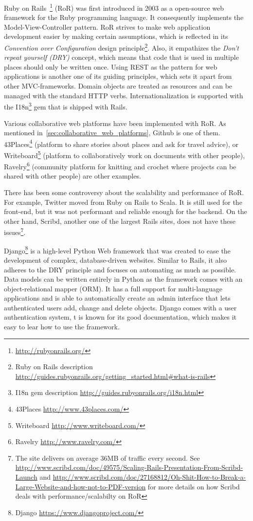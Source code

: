 Ruby on Rails~\footnote{\url{http://rubyonrails.org/}} (RoR) was first introduced in 2003 as a open-source web framework for the Ruby programming language. It consequently implements the Model-View-Controller pattern. 
RoR strives to make web application development easier by making certain assumptions, which is reflected in its \textit{Convention over Configuration} design principle\footnote{Ruby on Rails description \url{http://guides.rubyonrails.org/getting_started.html#what-is-rails}}. Also, it empathizes the \textit{Don't repeat yourself (DRY)} concept, which means that code that is used in multiple places should only be written once. 
Using REST as the pattern for web applications is another one of its guiding principles, which sets it apart from other MVC-frameworks. Domain objects are treated as resources and can be managed with the standard HTTP verbs. Internationalization is supported with the I18n\footnote{I18n gem description \url{http://guides.rubyonrails.org/i18n.html}} gem that is shipped with Rails.

Various collaborative web platforms have been implemented with RoR. As mentioned in~\ref{sec:collaborative_web_platforms}, Github is one of them. 43Places\footnote{43Places \url{http://www.43places.com/}} (platform to share stories about places and ask for travel advice), or Writeboard\footnote{Writeboard \url{http://www.writeboard.com/}} (platform to collaboratively work on documents with other people), Ravelry\footnote{Ravelry \url{http://www.ravelry.com/}} (community platform for knitting and crochet where projects can be shared with other people) are other examples.

There has been some controversy about the scalability and performance of RoR. For example, Twitter moved from Ruby on Rails to Scala. It is still used for the front-end, but it was not performant and reliable enough for the backend\cite{twitter_ruby_scala}. On the other hand, Scribd, another one of the largest Rails sites, does not have these issues\footnote{The site delivers on average 36MB of traffic every second. See \url{http://www.scribd.com/doc/49575/Scaling-Rails-Presentation-From-Scribd-Launch} and \url{http://www.scribd.com/doc/27168812/Oh-Shit-How-to-Break-a-Large-Website-and-how-not-to-PDF-version} for more details on how Scribd deals with performance/scalabilty on RoR}.

Django\footnote{Django \url{https://www.djangoproject.com/}} is a high-level Python Web framework that was created to ease the development of complex, database-driven websites. Similar to Rails, it also adheres to the DRY principle and focuses on automating as much as possible. Data models can be written entirely in Python as the framework comes with an object-relational mapper (ORM). It has a full support for multi-language applications and is able to automatically create an admin interface that lets authenticated users add, change and delete objects. Django comes with a user authentication system, t is known for its good documentation, which makes it easy to lear how to use the framework.

